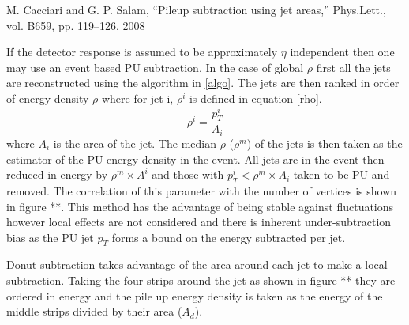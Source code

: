 M. Cacciari and G. P. Salam, “Pileup subtraction using jet areas,” Phys.Lett., vol. B659, pp. 119–126, 2008

If the detector response is assumed to be approximately $\eta$ independent then one may use an event based PU subtraction. In the case of global $\rho$ first all the jets are reconstructed using the algorithm in \ref{algo}. The jets are then ranked in order of energy density $\rho$ where for jet i, $\rho^i$ is defined in equation \ref{rho}.
\begin{equation}
\label{rho}
\rho^i = \frac{p^i_{T}}{A_i} 
\end{equation}
where $A_i$ is the area of the jet. The median $\rho$ ($\rho^m$) of the jets is then taken as the estimator of the PU energy density in the event. All jets are in the event then reduced in energy by $\rho^m \times A^i$ and those with $p_{T}^i < \rho^m \times A_i$ taken to be PU and removed. The correlation of this parameter with the number of vertices is shown in figure **. This method has the advantage of being stable against fluctuations however local effects are not considered and there is inherent under-subtraction bias as the PU jet $p_{T}$ forms a bound on the energy subtracted per jet.

Donut subtraction takes advantage of the area around each jet to make a local subtraction. Taking the four strips around the jet as shown in figure ** they are ordered in energy and the pile up energy density is taken as the energy of the middle strips divided by their area ($A_d$).      
